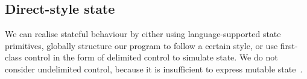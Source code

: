 \documentclass[12pt,phd,lfcs,twoside,openright,logo,leftchapter,normalheadings]{infthesis}
\theoremstyle{plain}
\theoremstyle{definition}
\begin{document}
\subsection{Direct-style state}
\label{sec:direct-style-state}
%
We can realise stateful behaviour by either using language-supported
state primitives, globally structure our program to follow a certain
style, or use first-class control in the form of delimited control to
simulate state. We do not consider undelimited control, because it is
insufficient to express mutable state~\cite{FriedmanS00}.

%


\end{document}
